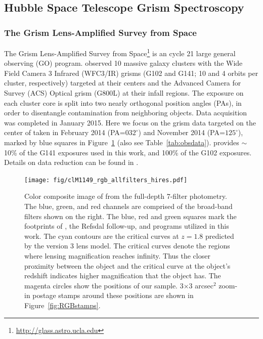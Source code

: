 \subsection{Hubble Space Telescope Grism Spectroscopy}\label{subsect:hstdata}



\subsubsection{The Grism Lens-Amplified Survey from Space}\label{subsect:glass}

The Grism Lens-Amplified Survey from Space\footnote{\url{http://glass.astro.ucla.edu}} \citep[\glass; Proposal ID 13459;
P.I. Treu,][]{2014ApJ...782L..36S,2015ApJ...812..114T} is an \hst cycle 21 large general observing (GO) program.  \glass
observed 10 massive galaxy
clusters with the Wide Field Camera 3 Infrared (WFC3/IR) grisms (G102 and G141; 10 and 4 orbits per cluster,
respectively) targeted at their centers and the Advanced Camera for Survey (ACS) Optical grism (G800L) at their infall
regions.
The exposure on each cluster core is split into two nearly orthogonal
position angles (PAs), in order to disentangle contamination from neighboring objects.
Data acquisition was completed in January 2015. Here we focus on the grism data targeted on the center of
\clyi taken in February 2014 (PA=$032^{\circ}$) and November 2014 (PA=$125^{\circ}$), marked by blue squares in
Figure~\ref{fig:RGBfullFoV} (also see Table~\ref{tab:obsdata}). \glass provides $\sim$10\% of the G141
exposures used in this work, and 100\% of the G102 exposures.  Details on \glass data reduction can be found in
\citet{2014ApJ...782L..36S,2015ApJ...812..114T}.

\begin{figure}
    \centering
    \texttt{[image: fig/clM1149\_rgb\_allfilters\_hires.pdf]}
    \caption[Color composite image of \clyi from the full-depth 7-filter \hff photometry.]{Color composite image of \clyi from the full-depth 7-filter \hff photometry.
    The blue, green, and red channels are comprised of the \hst broad-band filters shown on
    the right. The blue, red and green squares mark the footprints of \glass, the Refsdal
    follow-up, and \muse programs utilized in this work.  The cyan contours are the critical
    curves at $z=1.8$ predicted by the \glafic version 3 lens model.
    The critical curves denote the regions where lensing magnification reaches infinity.
    Thus the closer proximity between the object and the critical curve at the object's redshift indicates higher magnification
    that the object has.
    The magenta circles show the positions of our \mg sample. 3$\times$3 arcsec$^2$ zoom-in postage stamps around
    these positions are shown in Figure~\ref{fig:RGBstamps}.
    \label{fig:RGBfullFoV}}
\end{figure}

